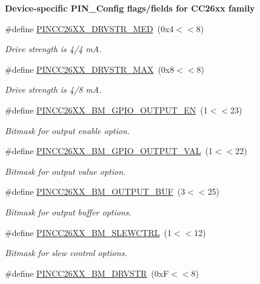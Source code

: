 \begin{Indent}{\bf Device-\/specific P\+I\+N\+\_\+\+Config flags/fields for C\+C26xx family}
\begin{DoxyCompactItemize}
\#define \hyperlink{_p_i_n_c_c26_x_x_8h_a2ea27041c2de39b7d28b4a495dd420c3}{P\+I\+N\+C\+C26\+X\+X\+\_\+\+D\+R\+V\+S\+T\+R\+\_\+\+M\+E\+D}~(0x4$<$$<$8)
\begin{DoxyCompactList}\small\item\em Drive strength is 4/4 m\+A. \end{DoxyCompactList}\item 
\#define \hyperlink{_p_i_n_c_c26_x_x_8h_a541e467017624634a4549399479bac35}{P\+I\+N\+C\+C26\+X\+X\+\_\+\+D\+R\+V\+S\+T\+R\+\_\+\+M\+A\+X}~(0x8$<$$<$8)
\begin{DoxyCompactList}\small\item\em Drive strength is 4/8 m\+A. \end{DoxyCompactList}\item 
\#define \hyperlink{_p_i_n_c_c26_x_x_8h_a6563826ffb2b58202eb73a66a65300cd}{P\+I\+N\+C\+C26\+X\+X\+\_\+\+B\+M\+\_\+\+G\+P\+I\+O\+\_\+\+O\+U\+T\+P\+U\+T\+\_\+\+E\+N}~(1$<$$<$23)
\begin{DoxyCompactList}\small\item\em Bitmask for output enable option. \end{DoxyCompactList}\item 
\#define \hyperlink{_p_i_n_c_c26_x_x_8h_abf8ccbcf940ccff4ee0b256b536646ea}{P\+I\+N\+C\+C26\+X\+X\+\_\+\+B\+M\+\_\+\+G\+P\+I\+O\+\_\+\+O\+U\+T\+P\+U\+T\+\_\+\+V\+A\+L}~(1$<$$<$22)
\begin{DoxyCompactList}\small\item\em Bitmask for output value option. \end{DoxyCompactList}\item 
\#define \hyperlink{_p_i_n_c_c26_x_x_8h_a15e5f5f426864eecd22dde20df02da4a}{P\+I\+N\+C\+C26\+X\+X\+\_\+\+B\+M\+\_\+\+O\+U\+T\+P\+U\+T\+\_\+\+B\+U\+F}~(3$<$$<$25)
\begin{DoxyCompactList}\small\item\em Bitmask for output buffer options. \end{DoxyCompactList}\item 
\#define \hyperlink{_p_i_n_c_c26_x_x_8h_a84ba4d3153e7ed56d8b5e13a916491dd}{P\+I\+N\+C\+C26\+X\+X\+\_\+\+B\+M\+\_\+\+S\+L\+E\+W\+C\+T\+R\+L}~(1$<$$<$12)
\begin{DoxyCompactList}\small\item\em Bitmask for slew control options. \end{DoxyCompactList}\item 
\#define \hyperlink{_p_i_n_c_c26_x_x_8h_a5454b1e509752bf1630ecb9f8e5ed6c7}{P\+I\+N\+C\+C26\+X\+X\+\_\+\+B\+M\+\_\+\+D\+R\+V\+S\+T\+R}~(0x\+F$<$$<$8)
$$
\end{DoxyCompactItemize}
\end{Indent}
